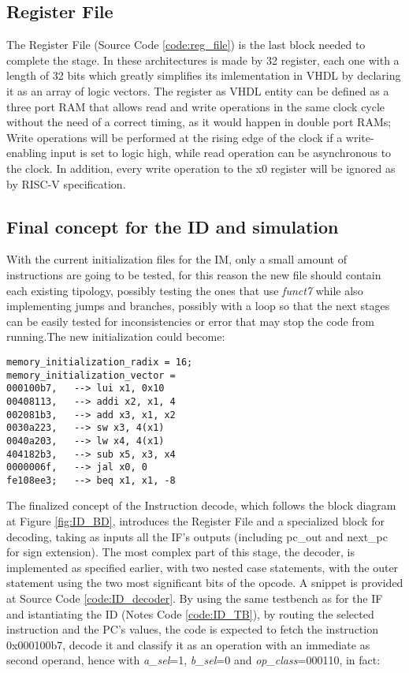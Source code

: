 \subsection{Register File}
The Register File (Source Code \ref{code:reg_file}) is the last block needed to complete the stage. In these architectures is made by 32 register, each one with a length of 32 bits which greatly simplifies its imlementation in VHDL by declaring it as an array of logic vectors.
The register as VHDL entity can be defined as a three port RAM that allows read and write operations in the same clock cycle without the need of a correct timing, as it would happen in double port RAMs; Write operations will be performed at the rising edge of the clock if a write-enabling input is set to logic high, while read operation can be asynchronous to the clock. In addition, every write operation to the x0 register will be ignored as by RISC-V specification.

\subsection{Final concept for the ID and simulation}
With the current initialization files for the IM, only a small amount of instructions are going to be tested, for this reason the new file should contain each existing tipology, possibly testing the ones that use \emph{funct7} while also implementing jumps and branches, possibly with a loop so that the next stages can be easily tested for inconsistencies or error that may stop the code from running.The new initialization could become:

\begin{verbatim}
memory_initialization_radix = 16;
memory_initialization_vector =
000100b7,   --> lui x1, 0x10
00408113,   --> addi x2, x1, 4
002081b3,   --> add x3, x1, x2
0030a223,   --> sw x3, 4(x1)
0040a203,   --> lw x4, 4(x1)
404182b3,   --> sub x5, x3, x4
0000006f,   --> jal x0, 0 
fe108ee3;   --> beq x1, x1, -8
\end{verbatim}

The finalized concept of the Instruction decode, which follows the block diagram at Figure \ref{fig:ID_BD}, introduces the Register File and a specialized block for decoding, taking as inputs all the IF's outputs (including {pc\_out} and {next\_pc} for sign extension).
The most complex part of this stage, the decoder, is implemented as specified earlier, with two nested case statements, with the outer statement using the two most significant bits of the opcode. A snippet is provided at Source Code \ref{code:ID_decoder}.
By using the same testbench as for the IF and istantiating the ID (Notes Code \ref{code:ID_TB}), by routing the selected instruction and the PC's values, the code is expected to fetch the instruction 0x000100b7, decode it and classify it as an operation with an immediate as second operand, hence with \emph{a{\_}sel}=1, \emph{b{\_}sel}=0 and \emph{op{\_}class}=000110, in fact:

